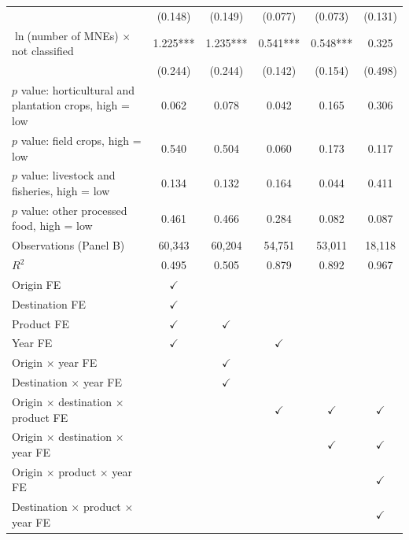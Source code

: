 \begin{tabular}{l*{5}{c}}
 & (0.148) & (0.149) & (0.077) & (0.073) & (0.131) \\
$\ln$(number of MNEs) $\times$ not classified & 1.225*** & 1.235*** & 0.541*** & 0.548*** & 0.325 \\
 & (0.244) & (0.244) & (0.142) & (0.154) & (0.498) \\
$p$ value: horticultural and plantation crops, high = low & 0.062 & 0.078 & 0.042 & 0.165 & 0.306 \\
$p$ value: field crops, high = low & 0.540 & 0.504 & 0.060 & 0.173 & 0.117 \\
$p$ value: livestock and fisheries, high = low & 0.134 & 0.132 & 0.164 & 0.044 & 0.411 \\
$p$ value: other processed food, high = low & 0.461 & 0.466 & 0.284 & 0.082 & 0.087 \\
Observations (Panel B) & 60,343 & 60,204 & 54,751 & 53,011 & 18,118 \\
$R^2$ & 0.495 & 0.505 & 0.879 & 0.892 & 0.967 \\
\midrule
Origin FE & $\checkmark$ &  &  &  &  \\
Destination FE & $\checkmark$ &  &  &  &  \\
Product FE & $\checkmark$ & $\checkmark$ &  &  &  \\
Year FE & $\checkmark$ &  & $\checkmark$ &  &  \\
Origin $\times$ year FE &  & $\checkmark$ &  &  &  \\
Destination $\times$ year FE &  & $\checkmark$ &  &  &  \\
Origin $\times$ destination $\times$ product FE &  &  & $\checkmark$ & $\checkmark$ & $\checkmark$ \\
Origin $\times$ destination $\times$ year FE &  &  &  & $\checkmark$ & $\checkmark$ \\
Origin $\times$ product $\times$ year FE &  &  &  &  & $\checkmark$ \\
Destination $\times$ product $\times$ year FE &  &  &  &  & $\checkmark$ \\
\bottomrule
\end{tabular}
